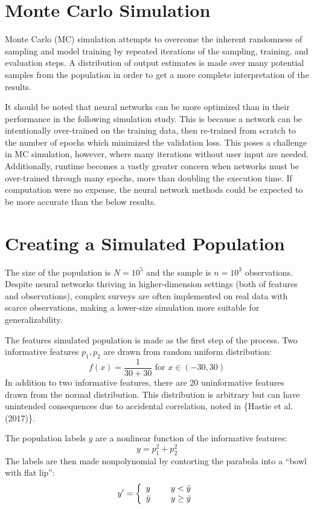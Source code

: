 \documentclass[12pt,twoside]{reedthesis}
\begin{document}
\section{Monte Carlo Simulation}\label{monte-carlo-simulation}

Monte Carlo (MC) simulation attempts to overcome the inherent randomness
of sampling and model training by repeated iterations of the sampling,
training, and evaluation steps. A distribution of output estimates is
made over many potential samples from the population in order to get a
more complete interpretation of the results.

It should be noted that neural networks can be more optimized than in
their performance in the following simulation study. This is because a
network can be intentionally over-trained on the training data, then
re-trained from scratch to the number of epochs which minimized the
validation loss. This poses a challenge in MC simulation, however, where
many iterations without user input are needed. Additionally, runtime
becomes a vastly greater concern when networks must be over-trained
through many epochs, more than doubling the execution time. If
computation were no expense, the neural network methods could be
expected to be more accurate than the below results.

\section{Creating a Simulated
Population}\label{creating-a-simulated-population}

The size of the population is \(N=10^5\) and the sample is \(n=10^3\)
observations. Despite neural networks thriving in higher-dimension
settings (both of features and observations), complex surveys are often
implemented on real data with scarce observations, making a lower-size
simulation more suitable for generalizability.

The features simulated population is made as the first step of the
process. Two informative features \(p_1, p_2\) are drawn from random
uniform distribution: \[
f(x) = \frac{1}{30+30} \text{ for } x \in (-30, 30)
\] In addition to two informative features, there are \(20\)
uninformative features drawn from the normal distribution. This
distribution is arbitrary but can have unintended consequences due to
accidental correlation, noted in \{Hastie et al. (2017)\}.

The population labels \(y\) are a nonlinear function of the informative
features: \[
y = p_1^2 + p_2^2
\] The labels are then made nonpolynomial by contorting the parabola
into a ``bowl with flat lip'': \[
y' = \left\{ \begin{array}{cc} 
                y & \hspace{5mm} y<\bar{y} \\
                \bar{y} & \hspace{5mm} y \geq \bar{y} \\
                \end{array} \right.
\]
\end{document}
